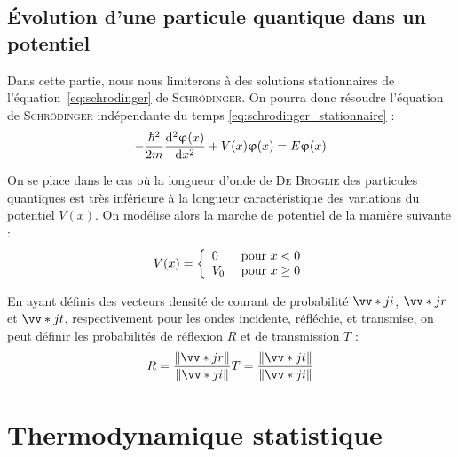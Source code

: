 \documentclass[11pt,a4paper,fleqn,pdftex]{report}
\begin{document}
\section{Évolution d'une particule quantique dans un potentiel} %
\label{sec:evolution_d_une_particule_quantique_dans_un_potentiel}
Dans cette partie, nous nous limiterons à des solutions stationnaires de l'équation~\eqref{eq:schrodinger} de \textsc{Schrödinger}. On pourra donc résoudre l'équation de \textsc{Schrödinger} indépendante du temps \eqref{eq:schrodinger_stationnaire} : 
\begin{equation*}
   - \dfrac{\hbar^2}{2m}\dfrac{\mathrm{d}^2 \upvarphi (x)}{\mathrm{d} x^2} + V(x)\upvarphi (x) = E\upvarphi (x)
\end{equation*}\par
On se place dans le cas où la longueur d'onde de \textsc{De Broglie} des particules quantiques est très inférieure à la longueur caractéristique des variations du potentiel $V(x)$. On modélise alors la marche de potentiel de la manière suivante : 
\begin{equation*}
   V(x)= \left\lbrace \begin{array}{l l} 0&\text{ pour }x<0 \\ V_0&\text{ pour }x\ge 0\end{array}\right.
\end{equation*}
\begin{dfn}
   En ayant définis des vecteurs densité de courant de probabilité $\vv*{j}{i}$, $\vv*{j}{r}$ et $\vv*{j}{t}$, respectivement pour les ondes incidente, réfléchie, et transmise, on peut définir les probabilités de réflexion $R$ et de transmission $T$ : 
      \begin{equation}
         R = \dfrac{\| \vv*{j}{r}\| }{\| \vv*{j}{i} \|}\\
         T = \dfrac{\| \vv*{j}{t}\| }{\| \vv*{j}{i} \|}
      \end{equation}
\end{dfn}
\chapter{Thermodynamique statistique} %
\label{cha:thermodynamique_statistique}
\end{document}
